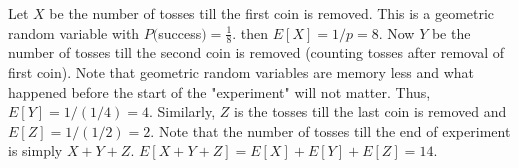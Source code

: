 \documentclass[../../probability-notes.tex]{subfile}
\begin{document}
Let $X$ be the number of tosses till the first coin is removed. This is a geometric random variable with $P($success$) = \frac{1}{8}$. then $E[X] = 1/p = 8$. Now $Y$ be the number of tosses till the second coin is removed (counting tosses after removal of first coin). Note that geometric random variables are memory less and what happened before the start of the "experiment" will not matter. Thus, $E[Y] = 1/(1/4) = 4$. Similarly, $Z$ is the tosses till the last coin is removed and $E[Z] = 1/(1/2) = 2$. Note that the number of tosses till the end of experiment is simply $X + Y + Z$. $E[X+Y+Z] = E[X] + E[Y] + E[Z] = 14$.
\end{document}
